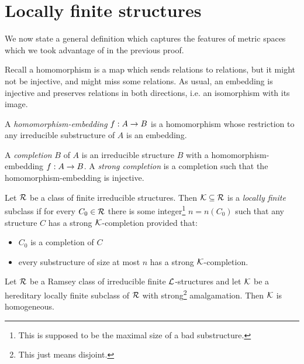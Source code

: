 \documentclass{amsart}
\begin{document}
\section{Locally finite structures}

We now state a general definition which captures the features of metric spaces which we
took advantage of in the previous proof.

Recall a homomorphism is a map which sends relations to relations, but it might not be
injective, and might miss some relations.
As usual, an embedding is injective and preserves relations in both directions, 
i.e. an isomorphism with its image.

\begin{defn}
A \emph{homomorphism-embedding} $f: A\rightarrow B$ is a homomorphism whose restriction to any
irreducible substructure of $A$ is an embedding.
\end{defn}

\begin{defn}
A \emph{completion} $B$ of $A$ is an irreducible structure $B$ with a
homomorphism-embedding $f:A\rightarrow B$.
A \emph{strong completion} is a completion such that the homomorphism-embedding is
injective.
\end{defn}

\begin{defn}
Let $\mathcal{R}$ be a class of finite irreducible structures. Then $\mathcal{K}\subseteq \mathcal{R}$ is a \emph{locally
finite} subclass if for every $C_0\in \mathcal{R}$ there is some integer\footnote{This is supposed
to be the maximal size of a bad substructure.} $n = n\left( C_0 \right)$
such that any structure $C$ has a strong $\mathcal{K}$-completion provided that:
\begin{itemize}
\item $C_0$ is a completion of $C$
\item every substructure of size at most $n$ has a strong $\mathcal{K}$-completion.
\end{itemize}
\end{defn}

\begin{thm}
Let $\mathcal{R}$ be a Ramsey class of irreducible finite $\mathcal{L}$-structures and let $\mathcal{K}$ be a
hereditary locally finite subclass of $\mathcal{R}$ with strong\footnote{This just means disjoint.} amalgamation.
Then $\mathcal{K}$ is homogeneous.
\end{thm}
\end{document}
